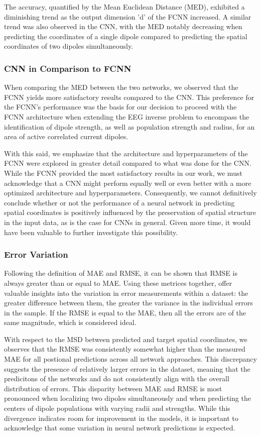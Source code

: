 \documentclass[a4paper, UKenglish, 11pt]{uiomaster}
\begin{document}
The accuracy, quantified by the Mean Euclidean Distance (MED), exhibited a diminishing trend as the output dimension 'd' of the FCNN increased. A similar trend was also observed in the CNN, with the MED notably decreasing when predicting the coordinates of a single dipole compared to predicting the spatial coordinates of two dipoles simultaneously.


\subsubsection{CNN in Comparison to FCNN}
When comparing the MED between the two networks, we observed that the FCNN yields more satisfactory results compared to the CNN. This preference for the FCNN's performance was the basis for our decision to proceed with the FCNN architecture when extending the EEG inverse problem to encompass the identification of dipole strength, as well as population strength and radius, for an area of active correlated current dipoles.

With this said, we emphasize that the architecture and hyperparameters of the FCNN were explored in greater detail compared to what was done for the CNN. While the FCNN provided the most satisfactory results in our work, we must acknowledge that a CNN might perform equally well or even better with a more optimized architecture and hyperparameters. Consequently, we cannot definitively conclude whether or not the performance of a neural network in predicting spatial coordinates is positively influenced by the preservation of spatial structure in the input data, as is the case for CNNs in general. Given more time, it would have been valuable to further investigate this possibility.

\subsubsection{Error Variation}
Following the definition of MAE and RMSE, it can be shown that RMSE is always greater than or equal to MAE. Using these metrices together, offer valuable insights into the variation in error measurements within a dataset: the greater difference between them, the greater the variance in the individual errors in the sample. If the RMSE is equal to the MAE, then all the errors are of the same magnitude, which is considered ideal.

With respect to the MSD between predicted and target spatial coordinates, we observes that the RMSE was consistently somewhat higher than the measured MAE for all postional predictions across all network approaches. This discrepancy suggests the presence of relatively larger errors in the dataset, meaning that the predicitons of the networks and do not consistently align with the overall distribution of errors. This disparity between MAE and RMSE is most pronounced when localizing two dipoles simultaneously and when predicting the centers of dipole populations with varying radii and strengths. While this divergence indicates room for improvement in the models, it is important to acknowledge that some variation in neural network predictions is expected.
\end{document}
